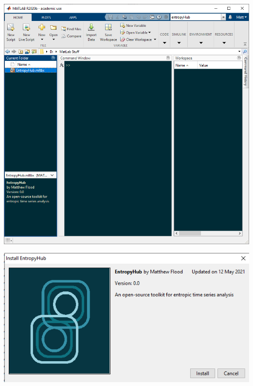 \documentclass[12pt, a4paper, titlepage, openany]{book}
\begin{document}
\begin{enumerate}
\begin{minipage}[h]{\linewidth}
          \includegraphics[scale=.6]{MATLAB_README1.png} \\
          \medskip
\end{minipage} 
\begin{minipage}[h]{\linewidth}
          \centering
          \includegraphics[scale=.7]{MATLAB_README2.png}
          \medskip
\end{minipage}
\end{enumerate}
\end{document}
